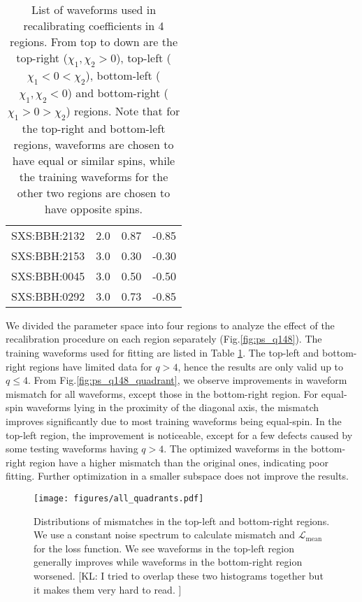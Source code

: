 \documentclass[twocolumn]{aastex631}
\newcommand{\kl}[1]{{\color{cyan}[KL: #1 ]}}
\begin{document}
\begin{table}[t]
\begin{tabularx}{0.8\columnwidth}{@{\extracolsep{\fill}}lrrr}
		SXS:BBH:2132 & 2.0 & 0.87     & -0.85    \\
		SXS:BBH:2153 & 3.0 & 0.30     & -0.30    \\
		SXS:BBH:0045 & 3.0 & 0.50     & -0.50    \\
		SXS:BBH:0292 & 3.0 & 0.73     & -0.85    \\ \midrule\bottomrule
	\end{tabularx}
	\caption{List of waveforms used in recalibrating coefficients in 4 regions. From top to down are the top-right ($\chi_1,\chi_2>0$), top-left ($\chi_1<0<\chi_2$), bottom-left ($\chi_1,\chi_2<0$) and bottom-right ($\chi_1>0>\chi_2$) regions. Note that for the top-right and bottom-left regions, waveforms are chosen to have equal or similar spins, while the training waveforms for the other two regions are chosen to have opposite spins.}
	\label{tab:quadrants}
\end{table}

We divided the parameter space into four regions to analyze the effect of the
recalibration procedure on each region separately (Fig.\ref{fig:ps_q148}). The
training waveforms used for fitting are listed in Table \ref{tab:quadrants}. The
top-left and bottom-right regions have limited data for $q>4$, hence the results are
only valid up to $q\leq4$. From Fig.\ref{fig:ps_q148_quadrant}, we observe
improvements in waveform mismatch for all waveforms, except those in the bottom-right region. For equal-spin waveforms lying in the proximity of the diagonal axis,
the mismatch improves significantly due to most training waveforms being
equal-spin. In the top-left region, the improvement is noticeable, except for a
few defects caused by some testing waveforms having $q>4$. The optimized
waveforms in the bottom-right region have a higher mismatch than the original ones,
indicating poor fitting. Further optimization in a smaller subspace does not
improve the results.

\begin{figure}[t]
	\centering
	\texttt{[image: figures/all\_quadrants.pdf]}
	\caption{Distributions of mismatches in the top-left and bottom-right regions.
	We use a constant noise spectrum to calculate mismatch and
	$\mathcal{L}_{\mathrm{mean}}$ for the loss function. We see waveforms in the top-left region generally improves while waveforms in the bottom-right region worsened. \kl{I tried to overlap these two histograms together but it makes them very hard to read. }}
	\label{fig:all_quadrants}
\end{figure}
\end{document}
